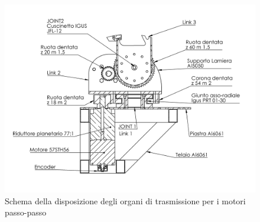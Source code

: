\documentclass[%
corpo=11pt,
twoside,
 stile=classica,
oldstyle,
greek,%
]{toptesi}
\begin{document}
	\begin{figure}
		\centering
		\includegraphics[width=\textwidth]{Screen/base.PNG}
		\caption{Schema della disposizione degli organi di trasmissione per i motori passo-passo}
		\label{fig:Stepper_cad}
	\end{figure}
\end{document}
